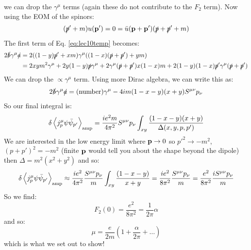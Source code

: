 we can drop the $\gamma^\mu$ terms (again these do not contribute to the $F_2$ term). Now using the EOM of the spinors:
\begin{equation}
    (\slashed{p}' + m)u(\mathbf{p}') = 0 = \bar{u}(\mathbf{p} + \mathbf{p}')(\slashed{p} + \slashed{p}' + m)
\end{equation}
The first term of Eq. \eqref{eq:lec10temp} becomes:
\begin{equation}
    \begin{split}
        2\slashed{b}\gamma^\mu \slashed{a} &= 2((1-y)\slashed{p}' + xm)\gamma^\mu ((1 - x)(\slashed{p} + \slashed{p}') + ym) 
        \\ &= 2xy m^2\gamma^\mu + 2y(1-y)\slashed{p}\gamma^\mu + 2\gamma^\mu  (\slashed{p} + \slashed{p}')x(1-x)m + 2(1-y)(1-x)\slashed{p}'\gamma^\mu (\slashed{p} + \slashed{p}')
    \end{split}
\end{equation}
We can drop the $\propto \gamma^\mu$ term. Using more Dirac algebra, we can write this as:
\begin{equation}
    2\slashed{b}\gamma^\mu \slashed{a} = (\text{number}) \gamma^\mu - 4im(1-x-y)(x + y)S^{\mu\nu}p_\nu
\end{equation}
So our final integral is:
\begin{equation}
    \delta \left< j^\mu_p \psi \bar{\psi}_{p'} \right>_{\text{amp}} = \frac{ie^2m}{4\pi^2}S^{\mu\nu}p_\nu \int_{xy}\frac{(1-x-y)(x+y)}{\Delta(x, y, p, p')}
\end{equation}
We are interested in the low energy limit where $\mathbf{p} \to 0$ so $p'^2 \to -m^2$, $(p + p')^2 = -m^2$ (finite $\mathbf{p}$ would tell you about the shape beyond the dipole) then $\Delta = m^2(x^2 + y^2)$ and so:
\begin{equation}
    \delta \left< j^\mu_p \psi \bar{\psi}_{p'} \right>_{\text{amp}} \approx \frac{ie^2}{4\pi^2}\frac{S^{\mu\nu}p_\nu}{m}\int_{xy}\frac{(1-x-y)}{x+y} = \frac{ie^2}{8\pi^2}\frac{S^{\mu\nu}p_\nu}{m} = \frac{e^2}{8\pi^2}\frac{iS^{\mu\nu}p_\nu}{m}
\end{equation}
So we find:
\begin{equation}
    F_2(0) = \frac{e^2}{8\pi^2} = \frac{1}{2\pi}\alpha
\end{equation}
and so:
\begin{equation}
    \boxed{\mu = \frac{e}{2m}\left(1 + \frac{\alpha}{2\pi} + \ldots\right)}
\end{equation}
which is what we set out to show!
